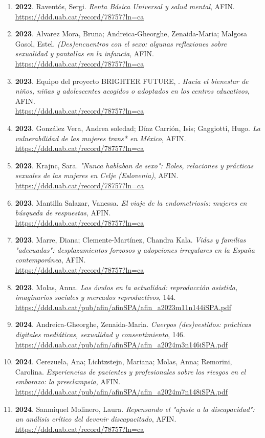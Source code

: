 \begin{enumerate}
\item {\bf 2022}. Raventós, Sergi. {\it Renta Básica Universal y salud mental}, AFIN. \\ \url{ https://ddd.uab.cat/record/78757?ln=ca }\filbreak
\item {\bf 2023}. Alvarez Mora, Bruna; Andreica-Gheorghe, Zenaida-Maria; Malgosa Gasol, Estel. {\it (Des)encuentros con el sexo: algunas reflexiones sobre sexualidad y pantallas en la infancia}, AFIN. \\ \url{ https://ddd.uab.cat/record/78757?ln=ca }\filbreak
\item {\bf 2023}. Equipo del proyecto BRIGHTER FUTURE, . {\it Hacia el bienestar de niños, niñas y adolescentes acogidos o adoptados en los centros educativos}, AFIN. \\ \url{ https://ddd.uab.cat/record/78757?ln=ca }\filbreak
\item {\bf 2023}. González Vera, Andrea soledad; Díaz Carrión, Isis; Gaggiotti, Hugo. {\it La vulnerabilidad de las mujeres trans* en México}, AFIN. \\ \url{ https://ddd.uab.cat/record/78757?ln=ca }\filbreak
\item {\bf 2023}. Krajnc, Sara. {\it "Nunca hablaban de sexo": Roles, relaciones y prácticas sexuales de las mujeres en Celje (Eslovenia)}, AFIN. \\ \url{ https://ddd.uab.cat/record/78757?ln=ca }\filbreak
\item {\bf 2023}. Mantilla Salazar, Vanessa. {\it El viaje de la endometriosis: mujeres en búsqueda de respuestas}, AFIN. \\ \url{ https://ddd.uab.cat/record/78757?ln=ca }\filbreak
\item {\bf 2023}. Marre, Diana; Clemente-Martínez, Chandra Kala. {\it Vidas y familias "adecuadas": desplazamientos forzosos y adopciones irregulares en la España contemporánea}, AFIN. \\ \url{ https://ddd.uab.cat/record/78757?ln=ca }\filbreak
\item {\bf 2023}. Molas, Anna. {\it Los óvulos en la actualidad: reproducción asistida, imaginarios sociales y mercados reproductivos}, 144. \\ \url{ https://ddd.uab.cat/pub/afin/afinSPA/afin\_a2023m11n144iSPA.pdf }\filbreak
\item {\bf 2024}. Andreica-Gheorghe, Zenaida-Maria. {\it Cuerpos (des)vestidos: prácticas digitales mediáticas, sexualidad y consentimiento}, 146. \\ \url{ https://ddd.uab.cat/pub/afin/afinSPA/afin\_a2024m3n146iSPA.pdf }\filbreak
\item {\bf 2024}. Cerezuela, Ana; Lichtzstejn, Mariana; Molas, Anna; Remorini, Carolina. {\it Experiencias de pacientes y profesionales sobre los riesgos en el embarazo: la preeclampsia}, AFIN. \\ \url{ https://ddd.uab.cat/pub/afin/afinSPA/afin\_a2024m7n148iSPA.pdf }\filbreak
\item {\bf 2024}. Sanmiquel Molinero, Laura. {\it Repensando el "ajuste a la discapacidad": un análisis crítico del devenir discapacitado}, AFIN. \\ \url{ https://ddd.uab.cat/record/78757?ln=ca }\filbreak
\end{enumerate} 
